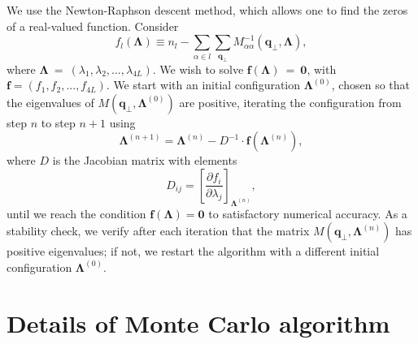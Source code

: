 \documentclass[aps,prx,reprint,runinaddress,superscriptaddress,amsmath,amssymb,floatfix,longbibliography]{revtex4-1}
\renewcommand{\vec}[1]{\boldsymbol{#1}}
\newcommand{\mat}[1]{#1}
\begin{document}
We use the Newton-Raphson descent method, which allows one to find the zeros of a real-valued function. Consider
\begin{equation}
f_l( \vec{\Lambda} ) \equiv n_l - \sum_{\alpha \in l} \sum_{\vec{q}_\perp} M^{-1}_{\alpha \alpha}(\vec{q}_\perp, \vec{\Lambda}) , 
\end{equation}
where $\vec{\Lambda}~=~(\lambda_1, \lambda_2, ..., \lambda_{4L})$. We wish to solve $ \vec{f}(\vec{\Lambda})~=~\vec{0}$, with $\vec{f} = (f_1, f_2, ..., f_{4L})$. We start with an initial configuration $\vec{ \Lambda}^{(0)} $, chosen so that the eigenvalues of $M(\vec{q}_\perp, \vec{\Lambda}^{(0)})$ are positive, iterating the configuration from step $n$ to step $n+1$ using
\begin{equation}
\vec{\Lambda}^{(n+1)} = \vec{\Lambda}^{(n)} - D^{-1} \cdot \vec{f}(\vec{\Lambda}^{(n)}) , 
\end{equation}
where $D$ is the Jacobian matrix with elements 
\begin{equation}
D_{ij} = \left[\frac{\partial f_i}{\partial \lambda_j}\right]_{\vec{\Lambda}^{(n)}} ,
\end{equation}
until we reach the condition $ \vec{f}(\vec{\Lambda}) = \vec{0}$ to satisfactory numerical accuracy. As a stability check, we verify after each iteration that the matrix $\mat{M}(\vec{q}_\perp, \vec{\Lambda}^{(n)})$ has positive eigenvalues; if not, we restart the algorithm with a different initial configuration $\vec{ \Lambda}^{(0)}$.

\section{Details of Monte Carlo algorithm}
\label{app:mc}
\end{document}
